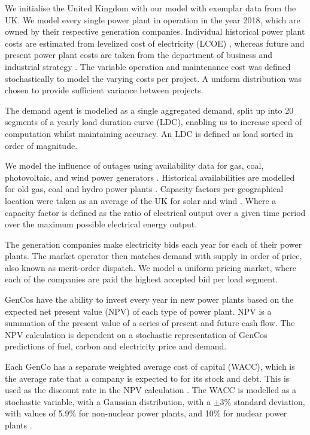 


We initialise the United Kingdom with our model with exemplar data from the UK. We model every single power plant in operation in the year 2018, which are owned by their respective generation companies. Individual historical power plant costs are estimated from levelized cost of electricity (LCOE) \cite{Dale2013, IEA2015,IRENA2018}, whereas future and present power plant costs are taken from the department of business and industrial strategy \cite{Department2016}. The variable operation and maintenance cost was defined stochastically to model the varying costs per project. A uniform distribution was chosen to provide sufficient variance between projects.

The demand agent is modelled as a single aggregated demand, split up into 20 segments of a yearly load duration curve (LDC), enabling us to increase speed of computation whilst maintaining accuracy. An LDC is defined as load sorted in order of magnitude. 

We model the influence of outages using availability data for gas, coal, photovoltaic, and wind power generators \cite{Ltd2016, Hunt2015, carroll-j}. Historical availabilities are modelled for old gas, coal and hydro power plants \cite{AlbertaSystemElectricOperator2016}. Capacity factors per geographical location were taken as an average of the UK for solar and wind \cite{Pfenninger2016, Staffell2016}. Where a capacity factor is defined as the ratio of electrical output over a given time period over the maximum possible electrical energy output. 

The generation companies make electricity bids each year for each of their power plants. The market operator then matches demand with supply in order of price, also known as merit-order dispatch. We model a uniform pricing market, where each of the companies are paid the highest accepted bid per load segment.

GenCos have the ability to invest every year in new power plants based on the expected net present value (NPV) of each type of power plant. NPV is a summation of the present value of a series of present and future cash flow. The NPV calculation is dependent on a stochastic representation of GenCos predictions of fuel, carbon and electricity price and demand.

Each GenCo has a separate weighted average cost of capital (WACC), which is the average rate that a company is expected to for its stock and debt. This is used as the discount rate in the NPV calculation \cite{KincheloeStephenC1990TWAC}. The WACC is modelled as a stochastic variable, with a Gaussian distribution, with a $\pm3\%$ standard deviation, with values of 5.9\% for non-nuclear power plants, and 10\% for nuclear power plants \cite{KPMG2017, Paper2012}. 

